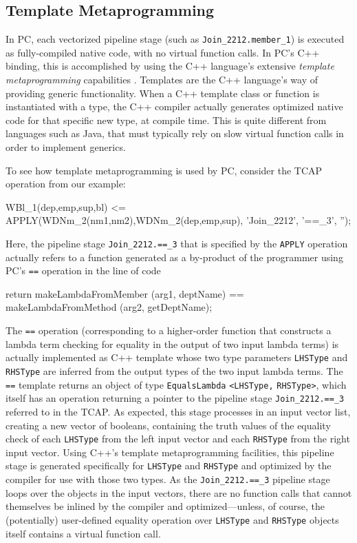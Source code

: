 \subsection{Template Metaprogramming}

In PC,
each vectorized pipeline stage (such as \texttt{Join\_2212.member\_1}) is executed as fully-compiled native code, with no virtual function
calls.
In PC's C++ binding, this is accomplished by using the C++ language's extensive \emph{template metaprogramming} 
capabilities \cite{josuttis2012c++}.  Templates are the C++ language's way of providing generic functionality.
When a C++ template class or
function is instantiated with a type, %
the C++ compiler actually generates optimized native code for that specific new type, at compile time.  
This is quite different from languages
such as Java, that must typically rely on slow virtual
function calls in order to implement generics.

To see how template metaprogramming is used by PC, consider
the TCAP operation from our example:

\begin{codesmall}
WBl_1(dep,emp,sup,bl) <= 
   APPLY(WDNm_2(nm1,nm2),WDNm_2(dep,emp,sup), 'Join_2212', '==_3', '');
\end{codesmall}

\noindent
Here, the pipeline stage \texttt{Join\_2212.==\_3} that is specified by the \texttt{APPLY} operation
actually refers to a function generated as a by-product of the
programmer using PC's \texttt{==} operation
in the line of code

\begin{codesmall} 
	return makeLambdaFromMember (arg1, deptName) == 
	       makeLambdaFromMethod (arg2, getDeptName); 
\end{codesmall}

\noindent The \texttt{==} 
operation (corresponding to a higher-order function that
constructs a lambda term checking for equality in the output of two input lambda terms) is actually implemented as C++ template
whose two type parameters \texttt{LHSType} and \texttt{RHSType} are inferred from
the output types of the two input lambda terms. 
The \texttt{==} template returns an object of type \texttt{EqualsLambda} \texttt{<LHSType,} \texttt{RHSType>}, which
itself has an operation returning a pointer to the pipeline stage \texttt{Join\_2212.==\_3} referred to in the TCAP.
As expected, this stage processes in an input vector list,
creating a new vector of booleans, containing the truth values of the equality check of each \texttt{LHSType} from the left
input vector and each \texttt{RHSType} from the right input vector.
Using C++'s template metaprogramming facilities, this 
pipeline stage is generated specifically for \texttt{LHSType} and \texttt{RHSType} and optimized by the compiler for use with those
two types.  
As the \texttt{Join\_2212.==\_3} pipeline stage loops over the objects in the input vectors, 
there are no function calls that cannot themselves be inlined by the compiler
and optimized---unless, of course, the (potentially) user-defined equality operation over \texttt{LHSType} and \texttt{RHSType}
objects itself contains a virtual function call.

